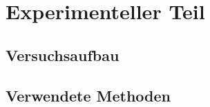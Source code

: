 \documentclass[../main.tex]{subfiles} %
\begin{document}
\chapter{Experimenteller Teil}\label{ch:experimenteller-teil}

    \section{Versuchsaufbau}\label{sec:versuchsaufbau}

    \section{Verwendete Methoden}\label{sec:verwendete-methoden}
\end{document}
